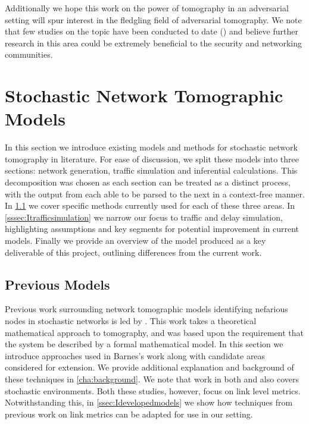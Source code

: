 Additionally we hope this work on the power of tomography in an adversarial setting will spur interest in the fledgling field of adversarial tomography. We note that few studies on the topic have been conducted to date (\cite{he_network_2021}) and believe further research in this area could be extremely beneficial to the security and networking communities.

\section{Stochastic Network Tomographic Models}
\label{sec:Imodels}

In this section we introduce existing models and methods for stochastic network tomography in literature. For ease of discussion, we split these models into three sections: network generation, traffic simulation and inferential calculations. This decomposition was chosen as each section can be treated as a distinct process, with the output from each able to be parsed to the next in a context-free manner. In \cref{ssec:Icurrentmodels} we cover specific methods currently used for each of these three areas. In \cref{sssec:Itrafficsimulation} we narrow our focus to traffic and delay simulation, highlighting assumptions and key segments for potential improvement in current models. Finally we provide an overview of the model produced as a key deliverable of this project, outlining differences from the current work.

\subsection{Previous Models}
\label{ssec:Icurrentmodels}

Previous work surrounding network tomographic models identifying nefarious nodes in stochastic networks is led by \cite{barnes_stochastic_2020}. This work takes a theoretical mathematical approach to tomography, and was based upon the requirement that the system be described by a formal mathematical model. In this section we introduce approaches used in Barnes's work along with candidate areas considered for extension. We provide additional explanation and background of these techniques in \cref{cha:background}. We note that work in both \cite{he_fisher_2015} and \cite{kolar_distributed_2020} also covers stochastic environments. Both these studies, however, focus on link level metrics. Notwithstanding this, in  \cref{ssec:Idevelopedmodels} we show how techniques from previous work on link metrics can be adapted for use in our setting.

